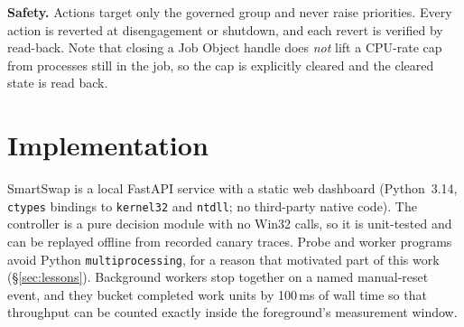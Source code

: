 \textbf{Safety.} Actions target only the governed group and never raise priorities. Every action is reverted at disengagement or shutdown, and each revert is verified by read-back. Note that closing a Job Object handle does \emph{not} lift a CPU-rate cap from processes still in the job, so the cap is explicitly cleared and the cleared state is read back.

\section{Implementation}
\label{sec:impl}

SmartSwap is a local FastAPI service with a static web dashboard (Python~3.14, \texttt{ctypes} bindings to \texttt{kernel32} and \texttt{ntdll}; no third-party native code). The controller is a pure decision module with no Win32 calls, so it is unit-tested and can be replayed offline from recorded canary traces. Probe and worker programs avoid Python \texttt{multiprocessing}, for a reason that motivated part of this work (\S\ref{sec:lessons}). Background workers stop together on a named manual-reset event, and they bucket completed work units by 100\,ms of wall time so that throughput can be counted exactly inside the foreground's measurement window.
